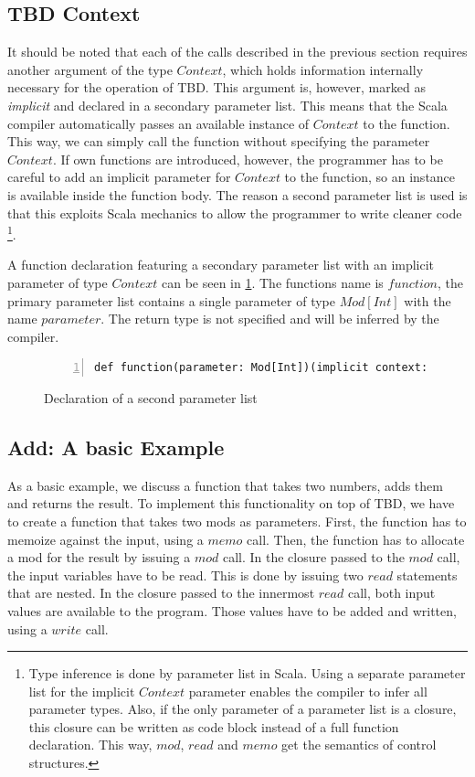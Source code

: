 \subsection{TBD Context} 

It should be noted that each of the calls described in the previous section requires another argument of the type $Context$, which holds information internally necessary for the operation of TBD. This argument is, however, marked as \textit{implicit} and declared in a secondary parameter list. This means that the Scala compiler automatically passes an available instance of $Context$ to the function. This way, we can simply call the function without specifying the parameter $Context$. If own functions are introduced, however, the programmer has to be careful to add an implicit parameter for $Context$ to the function, so an instance is available inside the function body. The reason a second parameter list is used is that this exploits Scala mechanics to allow the programmer to write cleaner code \footnote{Type inference is done by parameter list in Scala. Using a separate parameter list for the implicit $Context$ parameter enables the compiler to infer all parameter types. Also, if the only parameter of a parameter list is a closure, this closure can be written as code block instead of a full function declaration. This way, $mod$, $read$ and $memo$ get the semantics of control structures.}.

A function declaration featuring a secondary parameter list with an implicit parameter of type $Context$ can be seen in \ref{code:second_param}. The functions name is $function$, the primary parameter list contains a single parameter of type $Mod[Int]$ with the name $parameter$. The return type is not specified and will be inferred by the compiler. 

\begin{figure}
\begin{lstlisting}[frame=single,basicstyle=\ttfamily,numbers=left]
def function(parameter: Mod[Int])(implicit context: Context)
\end{lstlisting}
\caption{Declaration of a second parameter list}
\label{code:second_param}
\end{figure}

\subsection{Add: A basic Example}
\label{sec:tbd_basic_example}
As a basic example, we discuss a function that takes two numbers, adds them and returns the result. To implement this functionality on top of TBD, we have to create a function that takes two mods as parameters. First, the function has to memoize against the input, using a $memo$ call. Then, the function has to allocate a mod for the result by issuing a $mod$ call. In the closure passed to the $mod$ call, the input variables have to be read. This is done by issuing two $read$ statements that are nested. In the closure passed to the innermost $read$ call, both input values are available to the program. Those values have to be added and written, using a $write$ call. 

